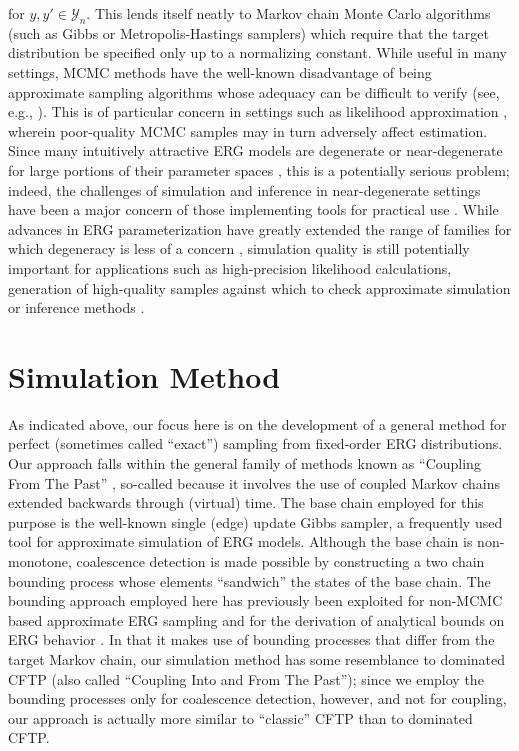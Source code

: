 \documentclass[11pt]{article}
\begin{document}
for $y,y' \in \mathcal{Y}_n$.  This lends itself neatly to Markov chain Monte Carlo algorithms (such as Gibbs or Metropolis-Hastings samplers) which require that the target distribution be specified only up to a normalizing constant.  While useful in many settings, MCMC methods have the well-known disadvantage of being approximate sampling algorithms whose adequacy can be difficult to verify (see, e.g., \citet{gamerman:bk:1997,gelman:ch:1996}).  This is of particular concern in settings such as likelihood approximation \citep{geyer.thompson:jrssC:1992,hunter.handcock:jcgs:2006}, wherein poor-quality MCMC samples may in turn adversely affect estimation.  Since many intuitively attractive ERG models are degenerate or near-degenerate for large portions of their parameter spaces \citep{strauss:siam:1986,handcock:ch:2003,schweinberger:jasa:2011}, this is a potentially serious problem; indeed, the challenges of simulation and inference in near-degenerate settings have been a major concern of those implementing tools for practical use \citep{hunter.et.al:jss:2008}.  While advances in ERG parameterization have greatly extended the range of families for which degeneracy is less of a concern \citep{lusher.et.al:bk:2012}, simulation quality is still potentially important for applications such as high-precision likelihood calculations, generation of high-quality samples against which to check approximate simulation or inference methods \citep[e.g.][]{pu.et.al:nips:2012,butts:jms:2015}.

\section{Simulation Method}

As indicated above, our focus here is on the development of a general method for perfect (sometimes called ``exact'') sampling from fixed-order ERG distributions.  Our approach falls within the general family of methods known as ``Coupling From The Past'' \citep{propp.wilson:rsa:1996}, so-called because it involves the use of coupled Markov chains extended backwards through (virtual) time.  The base chain employed for this purpose is the well-known single (edge) update Gibbs sampler, a frequently used tool for approximate simulation of ERG models.  Although the base chain is non-monotone, coalescence detection is made possible by constructing a two chain bounding process whose elements ``sandwich'' the states of the base chain. The bounding approach employed here has previously been exploited for non-MCMC based approximate ERG sampling \citep{butts:jms:2015} and for the derivation of analytical bounds on ERG behavior \citep{butts:sm:2011b}.  In that it makes use of bounding processes that differ from the target Markov chain, our simulation method has some resemblance to dominated CFTP \citep{kendall:proc:1997,kendall.moller:aap:2000} (also called ``Coupling Into and From The Past''); since we employ the bounding processes only for coalescence detection, however, and not for coupling, our approach is actually more similar to ``classic'' CFTP than to dominated CFTP.  
\end{document}
